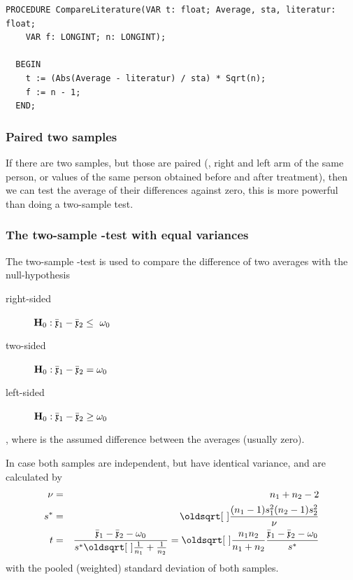 \begin{refsection}
\begin{lstlisting}[caption=t for comparing sample with population]
  PROCEDURE CompareLiterature(VAR t: float; Average, sta, literatur: float;
    VAR f: LONGINT; n: LONGINT);

  BEGIN
    t := (Abs(Average - literatur) / sta) * Sqrt(n);
    f := n - 1;
  END;
\end{lstlisting}

\subsubsection{Paired two samples}

If there are two samples, but those are paired (, right and left arm of the same person, or values of the same person obtained before and after treatment), then we can test the average of their differences against zero, this is more powerful than doing a two-sample test.

\subsubsection{The two-sample -test with equal variances}

The two-sample -test is used to compare the difference of two averages  with the null-hypothesis
\begin{description}
  \item[right-sided]{\( \mathbf{H}_0: \bar{\mathfrak{x}}_1 - \bar{\mathfrak{x}}_2  \leq\ \omega_0 \)}
  \item[two-sided]{\( \mathbf{H}_0: \bar{\mathfrak{x}}_1 - \bar{\mathfrak{x}}_2  = \omega_0 \)}
  \item[left-sided]{\( \mathbf{H}_0: \bar{\mathfrak{x}}_1 - \bar{\mathfrak{x}}_2  \geq \omega_0 \)}
\end{description}
, where  is the assumed difference between the averages (usually zero).

In case both samples are independent, but have identical variance,  and \skalar{\nu} are calculated by
\begin{eqnarray}
  \nonumber
  \nu &=& n_1 + n_2 - 2 \\
  \nonumber
  s^* &=& \sqrt{\frac{(n_1 - 1) s_1^2 (n_2 - 1) s_2^2}{\nu}} \\
  t &=& \frac{\bar{\AbsVec{x}}_1 - \bar{\AbsVec{x}}_2 - \omega_0}{s^* \sqrt{\frac{1}{n_1}+\frac{1}{n_2}}} = \sqrt{\frac{n_1 n_2}{n_1 + n_2}} \frac{\bar{\AbsVec{x}}_1 - \bar{\AbsVec{x}}_2 - \omega_0}{s^*}
\end{eqnarray}
with  the pooled (weighted) standard deviation of both samples.


\end{refsection}
